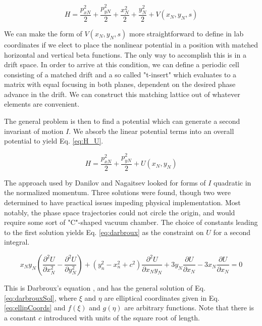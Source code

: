 \begin{equation} \label{eq:H_norm}
	H = \frac{p_{xN}^2}{2} + \frac{p_{yN}^2}{2}  + \frac{x_{N}^2}{2} + \frac{y_{N}^2}{2} + V(x_N,y_N,s)
\end{equation}

We can make the form of $V(x_N,y_N,s)$ more straightforward to define in lab coordinates if we elect to place the nonlinear potential in a position with matched horizontal and vertical beta functions. The only way to accomplish this is in a drift space. In order to arrive at this condition, we can define a periodic cell consisting of a matched drift and a so called "t-insert" which evaluates to a matrix with equal focusing in both planes, dependent on the desired phase advance in the drift. We can construct this matching lattice out of whatever elements are convenient. 

The general problem is then to find a potential which can generate a second invariant of motion $I$. We absorb the linear potential terms into an overall potential to yield Eq. \ref{eq:H_U}. 

\begin{equation} \label{eq:H_U}
	H = \frac{p_{xN}^2}{2} + \frac{p_{yN}^2}{2} + U(x_N,y_N)
\end{equation}

The approach used by Danilov and Nagaitsev looked for forms of $I$ quadratic in the normalized momentum. Three solutions were found, though two were determined to have practical issues impeding physical implementation. Most notably, the phase space trajectories could not circle the origin, and would require some sort of "C"-shaped vacuum chamber. The choice of constants leading to the first solution yields Eq. \ref{eq:darbroux} as the constraint on $U$ for a second integral.

\begin{equation} \label{eq:darbroux}
	x_N y_N\left( \frac{\partial^2 U}{\partial x_N^2} - \frac{\partial^2 U}{\partial y_N^2}\right) + (y_n^2 - x_n^2 + c^2)\frac{\partial^2 U}{\partial x_N y_N} + 3y_N \frac{\partial U}{\partial x_N} - 3 x_N \frac{\partial U}{\partial x_N} = 0
\end{equation}

This is Darbroux's equation \cite{Darbroux}, and has the general solution of Eq. \ref{eq:darbrouxSol}, where $\xi$ and $\eta$ are elliptical coordinates given in Eq. \ref{eq:ellipCoords} and $f(\xi)$ and $g(\eta)$ are arbitrary functions. Note that there is a constant $c$ introduced with units of the square root of length.

